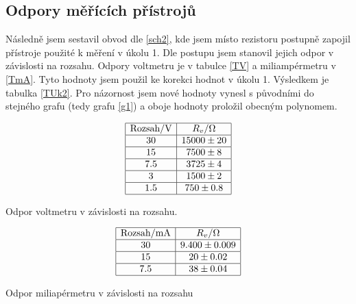 \documentclass[a4paper,12pt]{article}
\begin{document}
\subsection{Odpory měřících přístrojů}
Následně jsem sestavil obvod dle \ref{sch2}, kde jsem místo rezistoru postupně zapojil přístroje použité k měření v úkolu 1. Dle postupu jsem stanovil jejich odpor v závislosti 
na rozsahu. Odpory voltmetru je v tabulce \ref{TV} a miliampérmetru v \ref{TmA}. Tyto hodnoty jsem použil ke korekci hodnot v úkolu 1. Výsledkem je tabulka \ref{TUk2}. Pro 
názornost jsem nové hodnoty vynesl s původními do stejného grafu (tedy grafu \ref{g1}) a oboje hodnoty proložil obecným polynomem.

\begin{table}
$$
\begin{array}{|c|c|}
\hline
\mbox{Rozsah/V}&  R_v/\Omega \\ \hline
30& 15000\pm20 \\ \hline
15& 7500\pm8 \\ \hline
7.5&    3725\pm4 \\ \hline
3&  1500\pm2 \\ \hline
1.5&    750\pm0.8 \\ \hline
\end{array}
$$
\caption{Odpor voltmetru v závislosti na rozsahu.}
\label{TV}
\end{table}

\begin{table}
$$
\begin{array}{|c|c|}
\hline
\mbox{Rozsah/mA}&  R_v/\Omega \\ \hline
30& 9.400\pm0.009 \\ \hline
15& 20\pm0.02 \\ \hline
7.5& 38\pm 0.04 \\ \hline
\end{array}
$$
\caption{Odpor miliapérmetru v závislosti na rozsahu}
\label{TmA}
\end{table}
\end{document}
